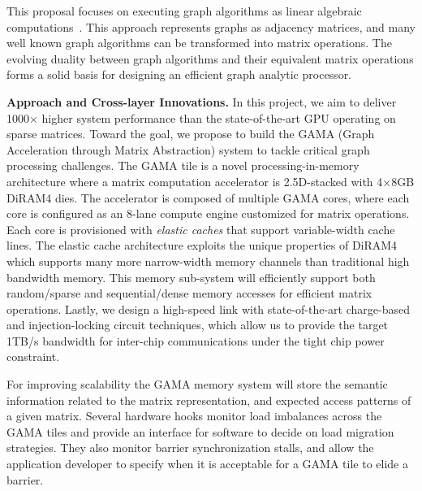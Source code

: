 \noindent
This proposal focuses on executing graph algorithms as linear algebraic computations~\cite{graph:primitives}. 
This approach represents graphs as adjacency matrices, and many well known graph algorithms can be transformed into matrix operations. 
The evolving 
duality between graph algorithms and their equivalent matrix operations forms a solid basis 
for designing an efficient graph analytic processor. 

\vspace{3pt}
\noindent
\textbf{Approach and Cross-layer Innovations.} 
In this project, we aim to deliver 1000$\times$ higher system performance than the state-of-the-art GPU operating on sparse matrices.
Toward the goal, we propose to build the GAMA (Graph Acceleration through Matrix Abstraction) system to tackle critical graph processing challenges. 
The GAMA tile is a novel processing-in-memory architecture where a matrix computation accelerator is 2.5D-stacked with 4$\times$8GB DiRAM4 dies.
The accelerator is composed of multiple GAMA cores, where each core is configured as an 8-lane %
compute engine customized for matrix operations. 
Each core is provisioned with \textit{elastic caches} 
that support variable-width cache lines.  
The elastic cache architecture exploits the unique properties of DiRAM4 which supports many more narrow-width memory channels than traditional high bandwidth memory.
This memory sub-system will efficiently support both random/sparse and sequential/dense memory accesses for efficient matrix operations. 
Lastly, we design a high-speed link with state-of-the-art charge-based and injection-locking circuit techniques, which allow us to provide the target 1TB/s bandwidth for inter-chip communications under the tight chip power constraint.

For improving scalability the GAMA memory system will store the semantic information related to the matrix representation, and expected access patterns of a given matrix. 
Several hardware hooks monitor load imbalances across the GAMA tiles and provide an interface for software to decide on load migration strategies. 
They also monitor barrier synchronization stalls, and allow the application developer to specify when it is acceptable for a GAMA tile to elide a barrier. 

